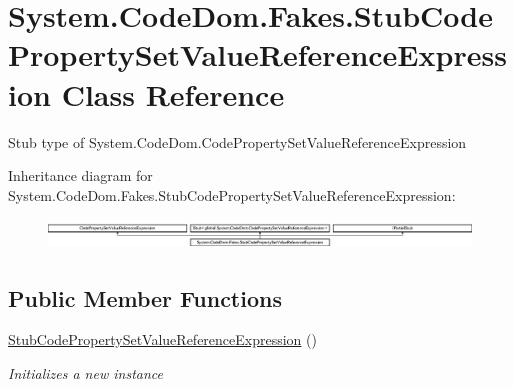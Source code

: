 \hypertarget{class_system_1_1_code_dom_1_1_fakes_1_1_stub_code_property_set_value_reference_expression}{\section{System.\-Code\-Dom.\-Fakes.\-Stub\-Code\-Property\-Set\-Value\-Reference\-Expression Class Reference}
\label{class_system_1_1_code_dom_1_1_fakes_1_1_stub_code_property_set_value_reference_expression}
}


Stub type of System.\-Code\-Dom.\-Code\-Property\-Set\-Value\-Reference\-Expression 


Inheritance diagram for System.\-Code\-Dom.\-Fakes.\-Stub\-Code\-Property\-Set\-Value\-Reference\-Expression\-:\begin{figure}[H]
\begin{center}
\leavevmode
\includegraphics[height=0.804598cm]{class_system_1_1_code_dom_1_1_fakes_1_1_stub_code_property_set_value_reference_expression}
\end{center}
\end{figure}
\subsection*{Public Member Functions}
\begin{DoxyCompactItemize}
\item 
\hyperlink{class_system_1_1_code_dom_1_1_fakes_1_1_stub_code_property_set_value_reference_expression_a99613057cf1bb05ed7083f91702eee8a}{Stub\-Code\-Property\-Set\-Value\-Reference\-Expression} ()
\begin{DoxyCompactList}\small\item\em Initializes a new instance\end{DoxyCompactList}\end{DoxyCompactItemize}
